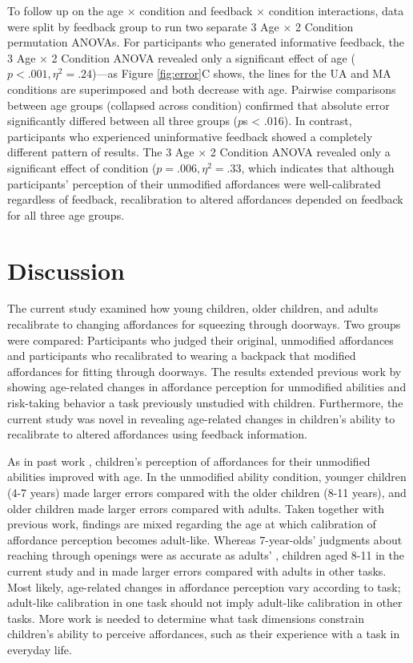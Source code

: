 \documentclass[a4paper,man,natbib,floatsintext,noextraspace]{apa6}
\begin{document}
To follow up on the age × condition and feedback × condition interactions, data were split by feedback group to run two separate 3 Age × 2 Condition permutation ANOVAs. For participants who generated informative feedback, the 3 Age × 2 Condition ANOVA revealed only a significant effect of age ($p < .001, \eta^{2} = .24$)---as Figure \ref{fig:error}C shows, the lines for the UA and MA conditions are superimposed and both decrease with age. Pairwise comparisons between age groups (collapsed across condition) confirmed that absolute error significantly differed between all three groups ($p$s < .016). In contrast, participants who experienced uninformative feedback showed a completely different pattern of results. The 3 Age × 2 Condition ANOVA revealed only a significant effect of condition ($p = .006, \eta^{2} = .33$, which indicates that although participants' perception of their unmodified affordances were well-calibrated regardless of feedback, recalibration to altered affordances depended on feedback for all three age groups.

\section{Discussion}

The current study examined how young children, older children, and adults recalibrate to changing affordances for squeezing through doorways. Two groups were compared: Participants who judged their original, unmodified affordances and participants who recalibrated to wearing a backpack that modified affordances for fitting through doorways. The results extended previous work by showing age-related changes in affordance perception for unmodified abilities and risk-taking behavior a task previously unstudied with children. Furthermore, the current study was novel in revealing age-related changes in children's ability to recalibrate to altered affordances using feedback information.

As in past work \citep{Plumert95,ChildReaching,KlevbergAnderson}, children's perception of affordances for their unmodified abilities improved with age. In the unmodified ability condition, younger children (4-7 years) made larger errors compared with the older children (8-11 years), and older children made larger errors compared with adults. Taken together with previous work, findings are mixed regarding the age at which calibration of affordance perception becomes adult-like. Whereas 7-year-olds' judgments about reaching through openings were as accurate as adults' \citep{ChildReaching}, children aged 8-11 in the current study and in \cite{Plumert95} made larger errors compared with adults in other tasks. Most likely, age-related changes in affordance perception vary according to task; adult-like calibration in one task should not imply adult-like calibration in other tasks. More work is needed to determine what task dimensions constrain children's ability to perceive affordances, such as their experience with a task in everyday life. 
\end{document}
